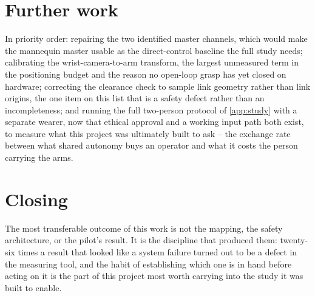 \section{Further work}

In priority order: repairing the two identified master channels, which would
make the mannequin master usable as the direct-control baseline the full
study needs; calibrating the wrist-camera-to-arm transform, the largest
unmeasured term in the positioning budget and the reason no open-loop grasp
has yet closed on hardware; correcting the clearance check to sample link
geometry rather than link origins, the one item on this list that is a
safety defect rather than an incompleteness; and running the full two-person
protocol of \cref{app:study} with a separate wearer, now that ethical
approval and a working input path both exist, to measure what this project
was ultimately built to ask -- the exchange rate between what shared
autonomy buys an operator and what it costs the person carrying the arms.

\section{Closing}

The most transferable outcome of this work is not the mapping, the safety
architecture, or the pilot's result. It is the discipline that produced them:
twenty-six times a result that looked like a system failure turned out to be
a defect in the measuring tool, and the habit of establishing which one is in
hand before acting on it is the part of this project most worth carrying
into the study it was built to enable.
